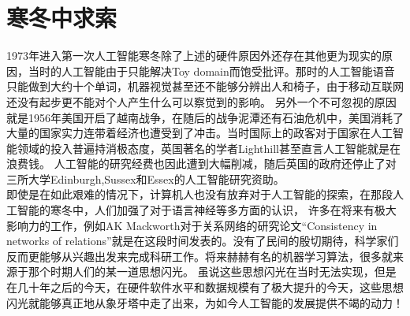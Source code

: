 \documentclass[12pt]{ctexart}
\begin{document}
\section{寒冬中求索}
\indent 1973年进入第一次人工智能寒冬除了上述的硬件原因外还存在其他更为现实的原因，当时的人工智能由于只能解决Toy domain而饱受批评。那时的人工智能语音只能做到大约十个单词，机器视觉甚至还不能够分辨出人和椅子，由于移动互联网还没有起步更不能对个人产生什么可以察觉到的影响。
另外一个不可忽视的原因就是1956年美国开启了越南战争，在随后的战争泥潭还有石油危机中，美国消耗了大量的国家实力连带着经济也遭受到了冲击。当时国际上的政客对于国家在人工智能领域的投入普遍持消极态度，英国著名的学者Lighthill甚至直言人工智能就是在浪费钱。
人工智能的研究经费也因此遭到大幅削减，随后英国的政府还停止了对三所大学Edinburgh,Sussex和Essex的人工智能研究资助。\\
\indent 即使是在如此艰难的情况下，计算机人也没有放弃对于人工智能的探索，在那段人工智能的寒冬中，人们加强了对于语言神经等多方面的认识，
许多在将来有极大影响力的工作，例如AK Mackworth对于关系网络的研究论文``Consistency in networks of relations''\cite{name6}就是在这段时间发表的。没有了民间的殷切期待，科学家们反而更能够从兴趣出发来完成科研工作。将来赫赫有名的机器学习算法，很多就来源于那个时期人们的某一道思想闪光。
虽说这些思想闪光在当时无法实现，但是在几十年之后的今天，在硬件软件水平和数据规模有了极大提升的今天，这些思想闪光就能够真正地从象牙塔中走了出来，为如今人工智能的发展提供不竭的动力！
\end{document}
